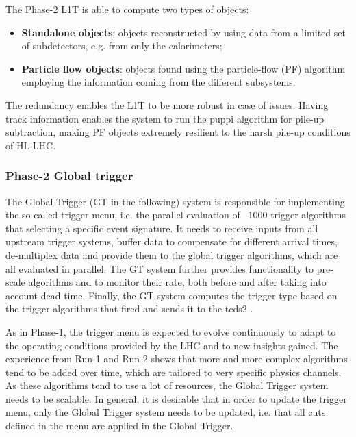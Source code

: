 \documentclass[../../main.tex]{subfiles}
\begin{document}
The Phase-2 L1T is able to compute two types of objects:
\begin{itemize}
    \item \textbf{Standalone objects}: objects reconstructed by using data from a limited set of subdetectors, e.g.
from only the calorimeters;
    \item \textbf{Particle flow objects}: objects found using the particle-flow (PF) algorithm employing the information coming from the different subsystems.
\end{itemize}

The redundancy enables the L1T to be more robust in case of issues. Having track information enables the system to run the \acrfull{puppi} algorithm \cite{PUPPI} for pile-up subtraction, making PF objects extremely resilient to the harsh pile-up conditions of HL-LHC.

\subsubsection{Phase-2 Global trigger}
\label{Phase-2_GT}

The Global Trigger (GT in the following) system is responsible for implementing the so-called trigger menu, i.e. the parallel evaluation of ~1000 trigger algorithms that selecting a specific event signature. It needs to receive inputs from all upstream trigger systems, buffer data to compensate for different arrival times, de-multiplex data and provide them to the global trigger algorithms, which are all evaluated in parallel. The GT system further provides functionality to pre-scale algorithms and to monitor their rate, both before and after taking into account dead time. Finally, the GT system computes the trigger type based on the trigger algorithms that fired and sends it to the \acrfull{tcds2} \cite{TCDS2}.  

As in Phase-1, the trigger menu is expected to evolve continuously to adapt to the operating conditions provided by the LHC and to new insights gained. The experience from Run-1 and Run-2 shows that more and more complex algorithms tend to be added over time, which are tailored to very specific physics channels. As these algorithms tend to use a lot of resources, the Global Trigger system needs to be scalable. In general, it is desirable that in order to update the trigger menu, only the Global Trigger system needs to be updated, i.e. that all cuts defined in the menu are applied in the Global Trigger.
\end{document}
